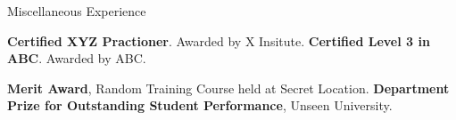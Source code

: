 \begin{rubric}{Miscellaneous Experience}

\entry*[2014] \textbf{Certified XYZ Practioner}. Awarded by X Insitute.
\entry*[2006] \textbf{Certified Level 3 in ABC}. Awarded by ABC.

\entry*[2002] \textbf{Merit Award}, Random Training Course held at Secret Location.
%
\entry*[2001] \textbf{Department Prize for Outstanding Student Performance}, Unseen University.


\end{rubric}